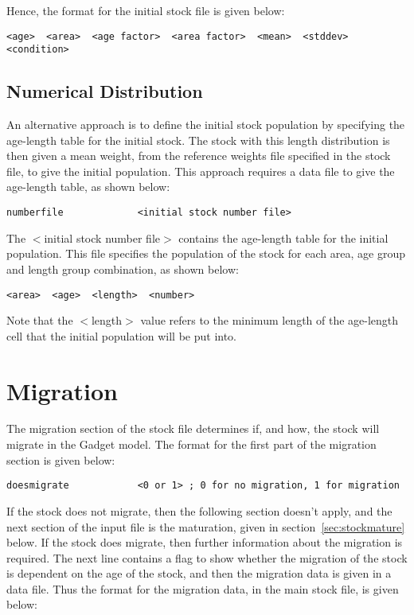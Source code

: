 \documentclass [a4paper, 10pt]{book}
\begin{document}
\bigskip
Hence, the format for the initial stock file is given below:

{\small\begin{verbatim}
<age>  <area>  <age factor>  <area factor>  <mean>  <stddev>  <condition>
\end{verbatim}}

\subsection{Numerical Distribution}
An alternative approach is to define the initial stock population by specifying the age-length table for the initial stock.  The stock with this length distribution is then given a mean weight, from the reference weights file specified in the stock file, to give the initial population.  This approach requires a data file to give the age-length table, as shown below:

{\small\begin{verbatim}
numberfile             <initial stock number file>
\end{verbatim}}

The $<$initial stock number file$>$ contains the age-length table for the initial population.  This file specifies the population of the stock for each area, age group and length group combination, as shown below:

{\small\begin{verbatim}
<area>  <age>  <length>  <number>
\end{verbatim}}

Note that the $<$length$>$ value refers to the minimum length of the age-length cell that the initial population will be put into.

\section{Migration}\label{sec:stockmigrate}
The migration section of the stock file determines if, and how, the stock will migrate in the Gadget model. The format for the first part of the migration section is given below:

{\small\begin{verbatim}
doesmigrate            <0 or 1> ; 0 for no migration, 1 for migration
\end{verbatim}}

If the stock does not migrate, then the following section doesn't apply, and the next section of the input file is the maturation, given in section~\ref{sec:stockmature} below.  If the stock does migrate, then further information about the migration is required.  The next line contains a flag to show whether the migration of the stock is dependent on the age of the stock, and then the migration data is given in a data file.  Thus the format for the migration data, in the main stock file, is given below:
\end{document}
